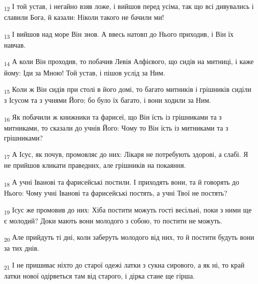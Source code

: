 \begin{tcolorbox}
\textsubscript{12} І той устав, і негайно взяв ложе, і вийшов перед усіма, так що всі дивувались і славили Бога, й казали: Ніколи такого не бачили ми!
\end{tcolorbox}
\begin{tcolorbox}
\textsubscript{13} І вийшов над море Він знов. А ввесь натовп до Нього приходив, і Він їх навчав.
\end{tcolorbox}
\begin{tcolorbox}
\textsubscript{14} А коли Він проходив, то побачив Левія Алфієвого, що сидів на митниці, і каже йому: Іди за Мною! Той устав, і пішов услід за Ним.
\end{tcolorbox}
\begin{tcolorbox}
\textsubscript{15} Коли ж Він сидів при столі в його домі, то багато митників і грішників сиділи з Ісусом та з учнями Його; бо було їх багато, і вони ходили за Ним.
\end{tcolorbox}
\begin{tcolorbox}
\textsubscript{16} Як побачили ж книжники та фарисеї, що Він їсть із грішниками та з митниками, то сказали до учнів Його: Чому то Він їсть із митниками та з грішниками?
\end{tcolorbox}
\begin{tcolorbox}
\textsubscript{17} А Ісус, як почув, промовляє до них: Лікаря не потребують здорові, а слабі. Я не прийшов кликати праведних, але грішників на покаяння.
\end{tcolorbox}
\begin{tcolorbox}
\textsubscript{18} А учні Іванові та фарисейські постили. І приходять вони, та й говорять до Нього: Чому учні Іванові та фарисейські постять, а учні Твої не постять?
\end{tcolorbox}
\begin{tcolorbox}
\textsubscript{19} Ісус же промовив до них: Хіба постити можуть гості весільні, поки з ними ще є молодий? Доки мають вони молодого з собою, то постити не можуть.
\end{tcolorbox}
\begin{tcolorbox}
\textsubscript{20} Але прийдуть ті дні, коли заберуть молодого від них, то й постити будуть вони за тих днів.
\end{tcolorbox}
\begin{tcolorbox}
\textsubscript{21} І не пришиває ніхто до старої одежі латки з сукна сирового, а як ні, то край латки нової одірветься там від старого, і дірка стане ще гірша.
\end{tcolorbox}
